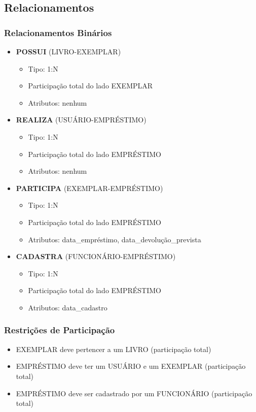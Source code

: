 \documentclass[12pt,a4paper]{article}
\begin{document}
\subsection{Relacionamentos}
\begin{tcolorbox}[title=Tipos de Relacionamentos]
\subsubsection{Relacionamentos Binários}
\begin{itemize}
    \item \textbf{POSSUI} (LIVRO-EXEMPLAR)
    \begin{itemize}
        \item Tipo: 1:N
        \item Participação total do lado EXEMPLAR
        \item Atributos: nenhum
    \end{itemize}

    \item \textbf{REALIZA} (USUÁRIO-EMPRÉSTIMO)
    \begin{itemize}
        \item Tipo: 1:N
        \item Participação total do lado EMPRÉSTIMO
        \item Atributos: nenhum
    \end{itemize}

    \item \textbf{PARTICIPA} (EXEMPLAR-EMPRÉSTIMO)
    \begin{itemize}
        \item Tipo: 1:N
        \item Participação total do lado EMPRÉSTIMO
        \item Atributos: data\_empréstimo, data\_devolução\_prevista
    \end{itemize}

    \item \textbf{CADASTRA} (FUNCIONÁRIO-EMPRÉSTIMO)
    \begin{itemize}
        \item Tipo: 1:N
        \item Participação total do lado EMPRÉSTIMO
        \item Atributos: data\_cadastro
    \end{itemize}
\end{itemize}

\subsubsection{Restrições de Participação}
\begin{itemize}
    \item EXEMPLAR deve pertencer a um LIVRO (participação total)
    \item EMPRÉSTIMO deve ter um USUÁRIO e um EXEMPLAR (participação total)
    \item EMPRÉSTIMO deve ser cadastrado por um FUNCIONÁRIO (participação total)
\end{itemize}
\end{tcolorbox}
\end{document}
